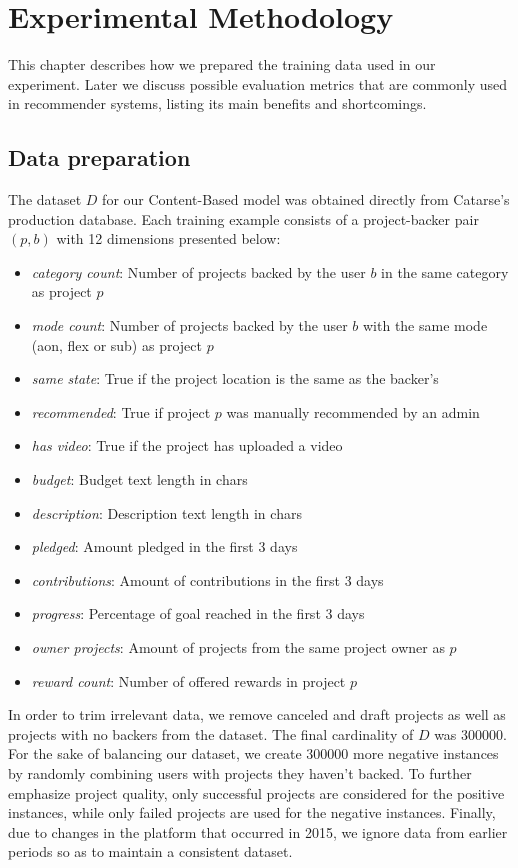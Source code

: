 \documentclass[cic,tc,english]{iiufrgs}
\begin{document}
\chapter{Experimental Methodology}
This chapter describes how we prepared the training data used in our experiment. Later we discuss possible evaluation metrics that are commonly used in recommender systems, listing its main benefits and shortcomings.
\section{Data preparation}
The dataset \(D\) for our Content-Based model was obtained directly from Catarse's production database. Each training example consists of a project-backer pair \((p,b)\) with 12 dimensions presented below:
\begin{itemize}

    \item \emph{category count}: Number of projects backed by the user \(b\) in the same category as project \(p\)
    \item \emph{mode count}: Number of projects backed by the user \(b\) with the same mode (aon, flex or sub) as project \(p\)
    \item \emph{same state}: True if the project location is the same as the backer's
    \item \emph{recommended}: True if project \(p\) was manually recommended by an admin
    \item \emph{has video}: True if the project has uploaded a video
    \item \emph{budget}: Budget text length in chars
    \item \emph{description}: Description text length in chars
    \item \emph{pledged}: Amount pledged in the first 3 days
    \item \emph{contributions}: Amount of contributions in the first 3 days
    \item \emph{progress}: Percentage of goal reached in the first 3 days
    \item \emph{owner projects}: Amount of projects from the same project owner as \(p\)
    \item \emph{reward count}: Number of offered rewards in project \(p\)
\end{itemize}

In order to trim irrelevant data, we remove canceled and draft projects as well as projects with no backers from the dataset. The final cardinality of \(D\) was 300000. For the sake of balancing our dataset, we create 300000 more negative instances by randomly combining users with projects they haven't backed. To further emphasize project quality, only successful projects are considered for the positive instances, while only failed projects are used for the negative instances. Finally, due to changes in the platform that occurred in 2015, we ignore data from earlier periods so as to maintain a consistent dataset.
\end{document}
